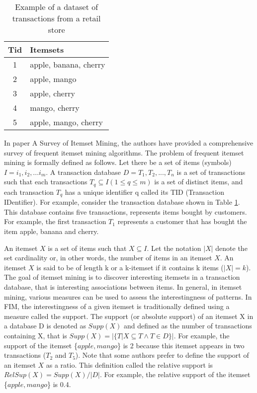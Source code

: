 \begin{table}[H]
    \centering
    \caption{Example of a dataset of transactions from a retail store}
    \label{tab:example_dataset_in_real}
    \begin{tabular}{|c|l|}
        \hline
        \textbf{Tid} & \textbf{Itemsets}     \\
        \hline
        1            & apple, banana, cherry \\
        2            & apple, mango          \\
        3            & apple, cherry         \\
        4            & mango, cherry         \\
        5            & apple, mango, cherry  \\
        \hline
    \end{tabular}
\end{table}

In paper A Survey of Itemset Mining\cite{survey_itemset_mining}, the authors have provided a comprehensive survey of frequent itemset mining algorithms.
The problem of frequent itemset mining is formally defined as follows.
Let there be a set of items (symbols) $I = {i_1, i_2, . . . i_m}$.
A transaction database $D = {T_1, T_2, . . ., T_n}$ is a set
of transactions such that each transactions $T_q \subseteq I(1 \leq q \leq m)$ is a set of distinct items,
and each transaction $T_q$ has a unique identifier q called its TID (Transaction IDentifier).
For example, consider the transaction database shown in Table \ref{tab:example_dataset_in_real}.
This database contains
five transactions, represents items bought by customers.
For example, the first transaction $T_1$ represents a customer that has bought the item apple, banana and cherry.

An itemset $X$ is a set of items such that $X \subseteq I$. Let the notation $|X|$ denote the set
cardinality or, in other words, the number of items in an itemset $X$. An itemset $X$ is said
to be of length k or a k-itemset if it contains k items ($|X| = k$).
The goal of itemset mining is to discover interesting itemsets in a transaction database,
that is interesting associations between items.
In general, in itemset mining, various measures can be used to assess the
interestingness of patterns. In FIM, the interestingness of a given itemset is traditionally
defined using a measure called the support. The support (or absolute support) of an itemset
X in a database D is denoted as $Supp(X)$ and defined as the number of transactions containing
X, that is $Supp(X) = |\{T|X \subseteq T \wedge T \in D\}|$.
For example, the support of the itemset \{$apple, mango$\} is 2 because this itemset appears in two transactions ($T_2$ and $T_5$).
Note that some authors prefer to define the support of an itemset $X$ as a ratio. This definition called the relative
support is $RelSup(X) = Supp(X)/|D|$. For example, the relative support of the itemset \{$apple, mango$\}
is 0.4.

